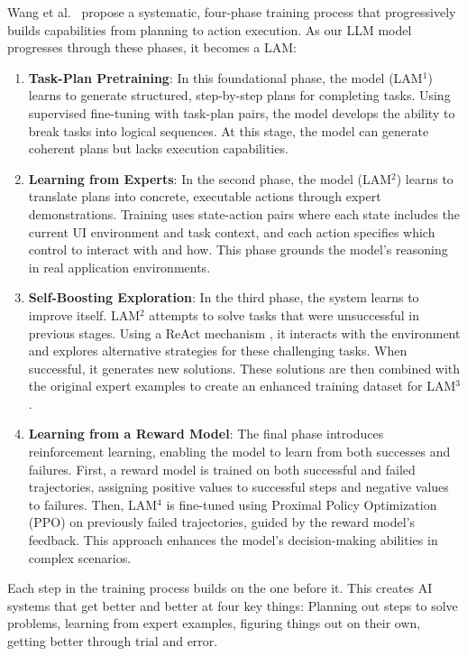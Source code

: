 \documentclass[journal,twoside,10pt]{IEEEtran}
\begin{document}
Wang et al.~\cite{wang2025lam} propose a systematic, four-phase training process that progressively builds capabilities from planning to action execution. As our LLM model progresses through these phases, it becomes a LAM:

\begin{enumerate}
    \item \textbf{Task-Plan Pretraining}: In this foundational phase, the model (LAM$^1$) learns to generate structured, step-by-step plans for completing tasks. Using supervised fine-tuning with task-plan pairs, the model develops the ability to break tasks into logical sequences. At this stage, the model can generate coherent plans but lacks execution capabilities.
    
    \item \textbf{Learning from Experts}: In the second phase, the model (LAM$^2$) learns to translate plans into concrete, executable actions through expert demonstrations. Training uses state-action pairs where each state includes the current UI environment and task context, and each action specifies which control to interact with and how. This phase grounds the model's reasoning in real application environments.
    
    \item \textbf{Self-Boosting Exploration}: In the third phase, the system learns to improve itself. LAM$^2$ attempts to solve tasks that were unsuccessful in previous stages. Using a ReAct mechanism \cite{yao2022react}, it interacts with the environment and explores alternative strategies for these challenging tasks. When successful, it generates new solutions. These solutions are then combined with the original expert examples to create an enhanced training dataset for LAM$^3$.
    
    \item \textbf{Learning from a Reward Model}: The final phase introduces reinforcement learning, enabling the model to learn from both successes and failures. First, a reward model is trained on both successful and failed trajectories, assigning positive values to successful steps and negative values to failures. Then, LAM$^4$ is fine-tuned using Proximal Policy Optimization (PPO) on previously failed trajectories, guided by the reward model's feedback. This approach enhances the model's decision-making abilities in complex scenarios.
\end{enumerate}

Each step in the training process builds on the one before it. This creates AI systems that get better and better at four key things: Planning out steps to solve problems, learning from expert examples, figuring things out on their own, getting better through trial and error.
\end{document}
